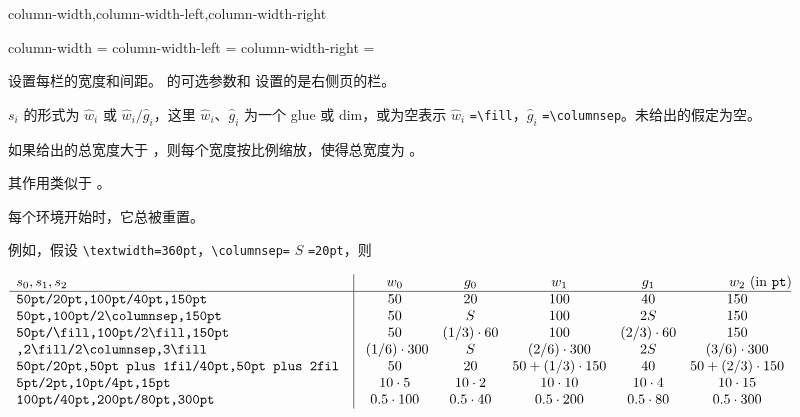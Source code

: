 \documentclass[twoside]{book}
\begin{document}
\begin{keyval}[path=paracol]{column-width,column-width-left,column-width-right}
  \begin{syntax}
    column-width       =  
    column-width-left  = 
    column-width-right = 
  \end{syntax}
设置每栏的宽度和间距。 的可选参数和  设置的是右侧页的栏。

$s_i$ 的形式为 $\hat{w}_i$ 或 $\hat{w}_i \texttt{/} \hat{g}_i$，这里 $\hat{w}_i$、$\hat{g}_i$ 为一个 glue 或 dim，或为空表示 $\hat{w}_i$ \verb|=\fill|，$\hat{g}_i$ \verb|=\columnsep|。未给出的假定为空。

如果给出的总宽度大于 ，则每个宽度按比例缩放，使得总宽度为 。

其作用类似于 。

每个环境开始时，它总被重置。
\end{keyval}

例如，假设 \verb|\textwidth=360pt|，\verb|\columnsep=| $S$ \verb|=20pt|，则

\begin{pagecenterbox}
\def\|{\verb|}\small{}
$\begin{array}[b]{l|ccccc}
s_0,s_1,s_2&w_0&g_0&w_1&g_1&w_2\rlap{ (in \texttt{pt})}\\\hline
\|50pt/20pt,100pt/40pt,150pt|&50&20&100&40&150\\
\|50pt,100pt/2\columnsep,150pt|&50&S&
                               100&2S&150\\
\|50pt/\fill,100pt/2\fill,150pt|&50&(1/3)\cdot60&100&(2/3)\cdot60&150\\
\|,2\fill/2\columnsep,3\fill|&\ (1/6)\cdot300&S&
                             (2/6)\cdot300&2S&
                             (3/6)\cdot300\\
\|50pt/20pt,50pt plus 1fil/40pt,50pt plus 2fil |&
                             50&20&50+(1/3)\cdot150&40&
                             50+(2/3)\cdot150\\
\|5pt/2pt,10pt/4pt,15pt|&10\cdot5&10\cdot2&10\cdot10&10\cdot4&
                        10\cdot15\\
\|100pt/40pt,200pt/80pt,300pt|&0.5\cdot100&0.5\cdot40&
                              0.5\cdot200&0.5\cdot80&
                              0.5\cdot300
\end{array}$
\end{pagecenterbox}
\end{document}
